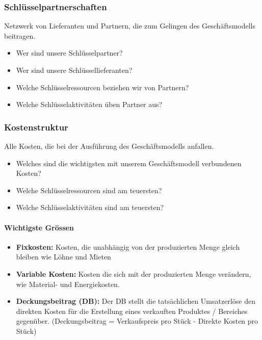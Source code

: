 \subsubsection{Schlüsselpartnerschaften}
Netzwerk von Lieferanten und Partnern, die zum Gelingen des Geschäftsmodells beitragen.
\begin{itemize}
	\item Wer sind unsere Schlüsselpartner?
	\item Wer sind unsere Schlüssellieferanten?
	\item Welche Schlüsselressourcen beziehen wir von Partnern?
	\item Welche Schlüsselaktivitäten üben Partner aus?
\end{itemize}

\subsubsection{Kostenstruktur}
Alle Kosten, die bei der Ausführung des Geschäftsmodells anfallen.
\begin{itemize}
	\item Welches sind die wichtigsten mit unserem Geschäftsmodell verbundenen Kosten?
	\item Welche Schlüsselressourcen sind am teuersten?
	\item Welche Schlüsselaktivitäten sind am teuersten?
\end{itemize}

\paragraph{Wichtigste Grössen}
\begin{itemize}
	\item \textbf{Fixkosten:} Kosten, die unabhängig von der produzierten Menge gleich bleiben wie Löhne und Mieten
	\item \textbf{Variable Kosten:} Kosten die sich mit der produzierten Menge verändern, wie Material- und	Energiekosten.
	\item \textbf{Deckungsbeitrag (DB):} Der DB stellt die tatsächlichen Umsatzerlöse den direkten Kosten für die Erstellung eines verkauften Produktes / Bereiches gegenüber. (Deckungsbeitrag = Verkaufspreis pro Stück - Direkte Kosten pro Stück)
\end{itemize}

